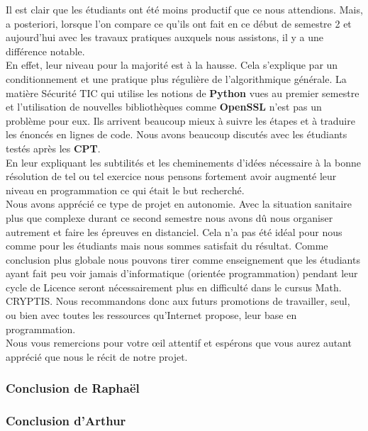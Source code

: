 \documentclass[12pt]{article}
\begin{document}
Il est clair que les étudiants ont été moins productif que ce nous attendions. Mais, a posteriori, lorsque l'on compare ce qu'ils ont fait en ce début de semestre 2 et aujourd'hui avec les travaux pratiques auxquels nous assistons, il y a une différence notable.\\

En effet, leur niveau pour la majorité est à la hausse. Cela s'explique par un conditionnement et une pratique plus régulière de l'algorithmique générale. La matière \textsf{Sécurité TIC} qui utilise les notions de \textbf{Python} vues au premier semestre et l'utilisation de nouvelles bibliothèques comme \textbf{OpenSSL} n'est pas un problème pour eux. Ils arrivent beaucoup mieux à suivre les étapes et à traduire les énoncés en lignes de code. Nous avons beaucoup discutés avec les étudiants testés après les \textbf{CPT}.\\

 En leur expliquant les subtilités et les cheminements d'idées nécessaire à la bonne résolution de tel ou tel exercice nous pensons fortement avoir augmenté leur niveau en programmation ce qui était le but recherché.\\
 
Nous avons apprécié ce type de projet en autonomie. Avec la situation sanitaire plus que complexe durant ce second semestre nous avons dû nous organiser autrement et faire les épreuves en distanciel. Cela n'a pas été idéal pour nous comme pour les étudiants mais nous sommes satisfait du résultat. Comme conclusion plus globale nous pouvons tirer comme enseignement que les étudiants ayant fait peu voir jamais d'informatique (orientée programmation) pendant leur cycle de Licence seront nécessairement plus en difficulté dans le cursus \textsf{Math. CRYPTIS}. Nous recommandons donc aux futurs promotions de travailler, seul, ou bien avec toutes les ressources qu'Internet propose, leur base en programmation.\\

Nous vous remercions pour votre œil attentif et espérons que vous aurez autant apprécié que nous le récit de notre projet.

\subsubsection{Conclusion de Raphaël}


\subsubsection{Conclusion d'Arthur}
\end{document}
